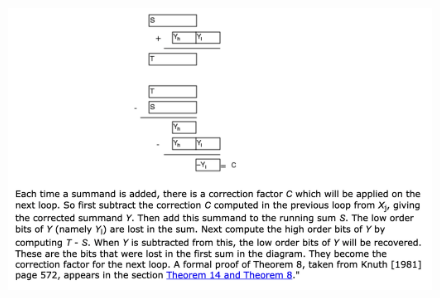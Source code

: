 \documentclass[11pt,fleqn]{exam}
\begin{document}
\begin{figure}[hbt!]
  	\centering
  	\includegraphics[width=1.0\textwidth]{kahanSum}
\end{figure}
\end{document}
